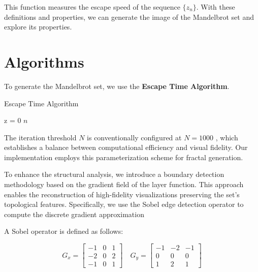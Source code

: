 \documentclass[11pt]{article}
\begin{document}
    This function measures the escape speed of the sequence $\{z_n\}$.
    With these definitions and properties, we can generate the image of the Mandelbrot set and explore its properties.


    \section{Algorithms}\label{sec:algorithms}

    To generate the Mandelbrot set, we use the \textbf{Escape Time Algorithm}.

    \begin{algorithm}[H]
        \SetAlgoLined
        \caption{Escape Time Algorithm}
        \label{alg:escape_time_algorithm}
        z = 0\;
        \Return $n$\;
    \end{algorithm}

    The iteration threshold $N$ is conventionally configured at $N = 1000$
    , which establishes a balance between computational efficiency and visual fidelity.
    Our implementation employs this parameterization scheme for fractal generation.

    To enhance the structural analysis, we introduce a boundary detection methodology based on the gradient field of the
    layer function.
    This approach enables the reconstruction of high-fidelity visualizations preserving the set's topological features.
    Specifically, we use the Sobel edge detection operator to compute the discrete gradient approximation

    A Sobel operator is defined as follows:

    \begin{equation}
        \label{eq:sobel_operator}
        G_x = \begin{bmatrix}
                  -1 & 0 & 1 \\
                  -2 & 0 & 2 \\
                  -1 & 0 & 1
        \end{bmatrix}
        \quad
        G_y = \begin{bmatrix}
                  -1 & -2 & -1 \\
                  0  & 0  & 0  \\
                  1  & 2  & 1
        \end{bmatrix}
    \end{equation}
\end{document}

